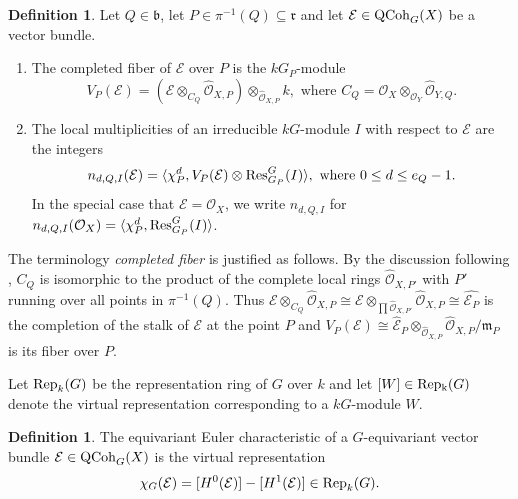 \documentclass[10pt]{amsart}
\theoremstyle{definition}
\newtheorem{definition}[theorem]{Definition}
\begin{document}
\begin{definition}\label{def:localmult}
Let $Q\in \mathfrak{b}$, let $P\in\pi^{-1}(Q)\subseteq\mathfrak{r}$ and let $\mathcal{E}\in{\rm QCoh}_G(X)$ be a vector bundle. 
\begin{enumerate}
\item The completed fiber of $\mathcal{E}$ over $P$ is the $kG_P$-module
\[
V_{P}(\mathcal{E})=(\mathcal{E}\otimes_{C_Q}\widehat{\mathcal{O}}_{X,P})\otimes_{\widehat{\mathcal{O}}_{X,P}} k,
\text{ where }
C_Q=\mathcal{O}_X\otimes_{\mathcal{O}_Y}\widehat{\mathcal{O}}_{Y,Q}.
\]
\item The local multiplicities of an irreducible $kG$-module $I$ with respect to $\mathcal{E}$ are the integers
\[
n_{d,Q,I}(\mathcal{E})=\langle \chi_P^d, V_P(\mathcal{E})\otimes {\rm Res}^G_{G_P}(I)\rangle,
\text{ where }
0\leq d\leq e_Q-1.
\]
In the special case that $\mathcal{E}=\mathcal{O}_X$, we write $n_{d,Q,I}$ for $n_{d,Q,I}(\mathcal{O}_X)=\langle \chi_P^d, {\rm Res}^G_{G_P}(I)\rangle$.
\end{enumerate}
\end{definition}

\vspace{3mm}


 The terminology {\em completed fiber} is justified as follows. By the discussion following \cite[Lemma 3.4]{MR589254},
$C_Q$ is isomorphic to the product of the complete local rings $\widehat{\mathcal{O}}_{X,P'}$ with $P'$ running over all points in $\pi^{-1}(Q)$. Thus $\mathcal{E}\otimes_{C_Q}\widehat{\mathcal{O}}_{X,P}\cong
\mathcal{E}\otimes_{\prod\widehat{\mathcal{O}}_{X,P'}}\widehat{\mathcal{O}}_{X,P}
\cong
\widehat{\mathcal{E}_P}$ is the completion of the stalk of $\mathcal{E}$ at the point $P$ and $V_{P}(\mathcal{E})\cong \widehat{\mathcal{E}}_P\otimes_{\widehat{\mathcal{O}}_{X,P}} \widehat{\mathcal{O}}_{X,P}/\mathfrak{m}_P$ is its fiber over $P$. 

\vspace{1.5mm}
 
Let ${\rm Rep}_k(G)$ be the representation ring of $G$ over $k$ and let $[W]\in{\rm Rep_k}(G)$ denote the virtual representation corresponding to a $kG$-module $W$. 
\begin{definition}\label{def:Euler}
The equivariant Euler characteristic of a $G$-equivariant vector bundle $\mathcal{E} \in {\rm QCoh}_G(X)$ is the virtual representation
\[
\chi_G(\mathcal{E})=[H^0(\mathcal{E})]-[H^1(\mathcal{E})]\in{\rm Rep}_k(G).
\]
\end{definition}
\end{document}
